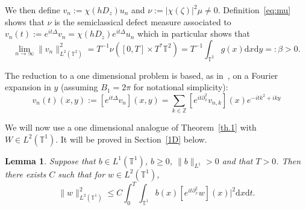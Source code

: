 \documentclass[11pt]{article}
\newtheorem{lemm}[theo]{Lemma}
\theoremstyle{definition}
\numberwithin{equation}{section}
\numberwithin{figure}{section}
\numberwithin{table}{section}
\newcommand{\TT}{{\mathbb T}}
\newcommand{\ZZ}{{\mathbb Z}}
\newcommand*{\dd}{\mathrm{d}}
\newcommand*{\dx}{\dd x}
\newcommand*{\dy}{\dd y}
\newcommand*{\dt}{\dd t}
\begin{document}
We then define $ v_n := \chi (h D_z) u_n $ and $\nu := |\chi (\zeta)|^2 \mu \neq 0 $. Definition~\eqref{eq:mu} shows that $ \nu $ is the semiclassical defect measure associated to $ v_n (t) := e^{ i t \Delta } v_n = \chi (h D_z) e^{ it \Delta } u_n $ which in particular shows that
\begin{equation}\label{eq:beta}
\lim_{n\to \infty} \| v_n \|_{ L^2 (\TT^2) }^2 = T^{-1} \nu ([0, T] \times T^* \TT^2) = T^{-1} \int_{ \TT^2 } g (x) \dx \dy =: \beta > 0.
\end{equation}

The reduction to a one dimensional problem is based, as in~\cite{BZ4}, on a Fourier expansion in $ y $ (assuming $ B_1 = 2 \pi $ for notational simplicity):
\begin{equation}\label{eq:Four}
v_n (t) (x, y) := [e^{ i t \Delta } v_n] (x, y) =
\sum_{ k \in \ZZ } [e^{ i t \partial_x^2 } v_{n, k }] (x) e^{-it k^2 + i ky }
\end{equation}

We will now use a one dimensional analogue of Theorem~\ref{th.1} with $ W \in L^2 (\TT^1) $. It will be proved in Section~\ref{1D} below.
\begin{lemm}\label{l:3}
Suppose that $ b \in L^1 (\TT^1) $, $ b\geq 0 $, $\| b \|_{ L^1 } > 0 $ and that $ T > 0 $. Then there exists $ C $ such that for $ w \in L^2 (\TT^1) $,
\begin{equation}\label{eq:l3}
\| w \|_{L^2 (\TT^1) }^2 \leq C \int_0^T \int_{\TT^1} b (x) [e^{ i t \partial_x^2} w](x)|^2 \dx \dt.
\end{equation}
\end{lemm}
\end{document}
